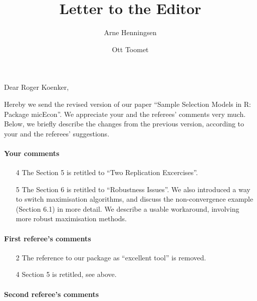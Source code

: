 \documentclass[a4paper]{article}
\title{Letter to the Editor}
\author{Arne Henningsen \and Ott Toomet}
\begin{document}
\maketitle

Dear Roger Koenker,

\bigskip

Hereby we send the revised version of our paper ``Sample Selection
Models in R: Package micEcon''.  We appreciate your and the referees'
comments very much.  Below, we briefly describe the changes from
the previous version, according to your and the referees' suggestions.

\paragraph{Your comments}

\begin{itemize}
\item[4] The Section 5 is retitled to ``Two Replication Excercises''.
\item[5] The Section 6 is retitled to ``Robustness Issues''.  We also
  introduced a way to switch maximisation algorithms, and discuss the
  non-convergence example (Section 6.1) in more detail.  We describe a
  usable workaround, involving more robust maximisation methods.
\end{itemize}

\paragraph{First referee's comments}

\begin{itemize}
\item[2] The reference to our package as ``excellent tool'' is removed.
\item[4] Section 5 is retitled, see above.
\end{itemize}

\paragraph{Second referee's comments}
\end{document}
